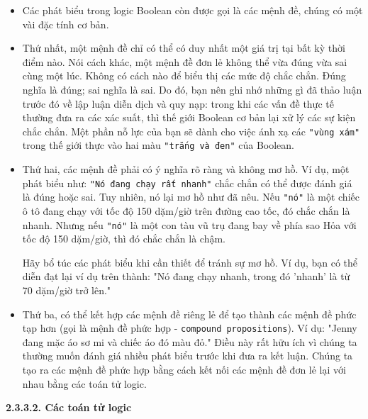 \begin{itemize}
    \item Các phát biểu trong logic Boolean còn được gọi là các mệnh đề, chúng có một vài đặc tính cơ bản.

    \item Thứ nhất, một mệnh đề chỉ có thể có duy nhất một giá trị tại bất kỳ thời điểm nào. Nói cách khác, một mệnh đề đơn lẻ không thể vừa đúng vừa sai cùng một lúc. Không có cách nào để biểu thị các mức độ chắc chắn. Đúng nghĩa là đúng; sai nghĩa là sai. Do đó, bạn nên ghi nhớ những gì đã thảo luận trước đó về lập luận diễn dịch và quy nạp: trong khi các vấn đề thực tế thường đưa ra các xác suất, thì thế giới Boolean cơ bản lại xử lý các sự kiện chắc chắn. Một phần nỗ lực của bạn sẽ dành cho việc ánh xạ các \verb|"vùng xám"| trong thế giới thực vào hai màu \verb|"trắng và đen"| của Boolean.

    \item Thứ hai, các mệnh đề phải có ý nghĩa rõ ràng và không mơ hồ. Ví dụ, một phát biểu như: \verb|"Nó đang chạy rất nhanh"| chắc chắn có thể được đánh giá là đúng hoặc sai. Tuy nhiên, nó lại mơ hồ như đã nêu. Nếu \verb|"nó"| là một chiếc ô tô đang chạy với tốc độ 150 dặm/giờ trên đường cao tốc, đó chắc chắn là nhanh. Nhưng nếu \verb|"nó"| là một con tàu vũ trụ đang bay về phía sao Hỏa với tốc độ 150 dặm/giờ, thì đó chắc chắn là chậm.

    \begin{tcolorbox}
Hãy bổ túc các phát biểu khi cần thiết để tránh sự mơ hồ. Ví dụ, bạn có thể diễn đạt lại ví dụ trên thành: "Nó đang chạy nhanh, trong đó 'nhanh' là từ 70 dặm/giờ trở lên."
    \end{tcolorbox}

    \item Thứ ba, có thể kết hợp các mệnh đề riêng lẻ để tạo thành các mệnh đề phức tạp hơn (gọi là mệnh đề phức hợp - \texttt{compound propositions}). Ví dụ: "Jenny đang mặc áo sơ mi và chiếc áo đó màu đỏ." Điều này rất hữu ích vì chúng ta thường muốn đánh giá nhiều phát biểu trước khi đưa ra kết luận. Chúng ta tạo ra các mệnh đề phức hợp bằng cách kết nối các mệnh đề đơn lẻ lại với nhau bằng các toán tử logic.
\end{itemize}

\noindent \textbf{2.3.3.2. Các toán tử logic}

